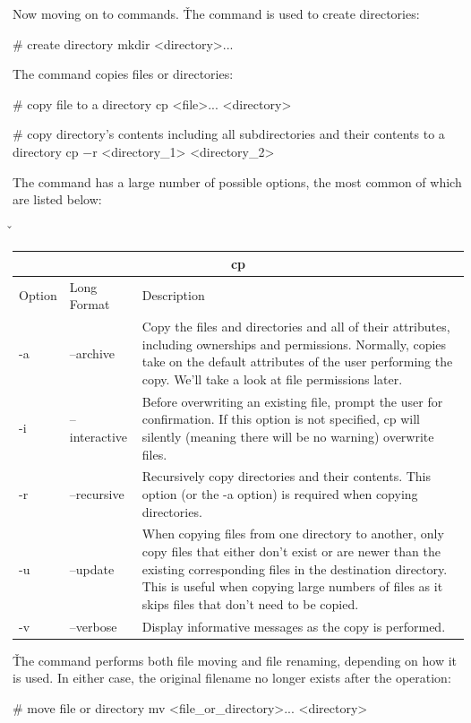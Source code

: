Now moving on to commands. \v

The  command is used to create directories:
\begin{bash}
# create directory
mkdir <directory>...
\end{bash}

The  command copies files or directories:
\begin{bash}
# copy file to a directory
cp <file>... <directory>
\end{bash}

\begin{bash}
# copy directory's contents including all subdirectories and their contents to a directory
cp $-$r <directory_1> <directory_2>
\end{bash}

The  command has a large number of possible options, the most common of which are listed below:

\v

\begin{tabular}{ |p{1cm}|p{3cm}||p{10.6cm}| }
\hline
\multicolumn{3}{|c|}{cp} \\
\hline
Option& Long Format& Description\\
\hline
-a & --archive & Copy the files and directories and all of their attributes, including ownerships and permissions.
Normally, copies take on the default attributes of the user performing the copy. We'll take a look at file permissions
later.\\
-i & --interactive & Before overwriting an existing file, prompt the user for confirmation. If this option is not
specified, cp will silently (meaning there will be no warning) overwrite files.\\
-r & --recursive & Recursively copy directories and their contents. This option (or the -a option) is required when
copying directories.\\
-u & --update & When copying files from one directory to another, only copy files that either don't exist or are newer
than the existing corresponding files in the destination directory. This is useful when copying large numbers of files
as it skips files that don't need to be copied.\\
-v & --verbose & Display informative messages as the copy is performed.\\
\hline
\end{tabular}

\v

The  command performs both file moving and file renaming, depending on how it is used. In either case,
the original filename no longer exists after the operation:
\begin{bash}
# move file or directory
mv <file_or_directory>... <directory>
\end{bash}

